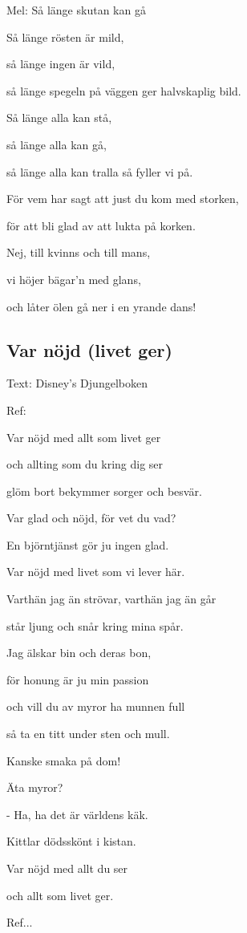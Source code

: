 Mel: Så länge skutan kan gå  \bigskip


Så länge rösten är mild,

så länge ingen är vild,

så länge spegeln på väggen ger halvskaplig bild.

Så länge alla kan stå,

så länge alla kan gå,

så länge alla kan tralla så fyller vi på.

För vem har sagt att just du kom med storken,

för att bli glad av att lukta på korken.

Nej, till kvinns och till mans,

vi höjer bägar'n med glans,

och låter ölen gå ner i en yrande dans!

\subsection{\textbf{Var nöjd (livet ger)}}

Text: Disney's Djungelboken\bigskip


Ref:

Var nöjd med allt som livet ger

och allting som du kring dig ser

glöm bort bekymmer sorger och besvär.

Var glad och nöjd, för vet du vad?

En björntjänst gör ju ingen glad.

Var nöjd med livet som vi lever här.\bigskip


Varthän jag än strövar, varthän jag än går

står ljung och snår kring mina spår.

Jag älskar bin och deras bon,

för honung är ju min passion

och vill du av myror ha munnen full

så ta en titt under sten och mull.

Kanske smaka på dom!

Äta myror?

- Ha, ha det är världens käk.

Kittlar dödsskönt i kistan.

Var nöjd med allt du ser

och allt som livet ger. \bigskip


Ref...\bigskip


